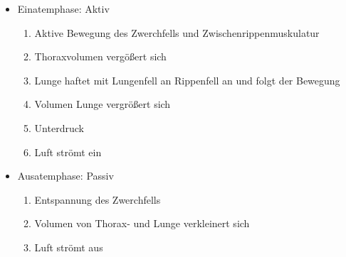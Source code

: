 {  
% 
% 
}%
{%
\begin{itemize}
  \item Einatemphase: Aktiv
  \begin{enumerate}
    \item Aktive Bewegung des Zwerchfells und Zwischenrippenmuskulatur
    \item Thoraxvolumen vergößert sich
    \item Lunge haftet mit Lungenfell an Rippenfell an und folgt der Bewegung
    \item Volumen Lunge vergrößert sich
    \item Unterdruck
    \item Luft strömt ein
  \end{enumerate}
  \item  Ausatemphase: Passiv
  \begin{enumerate}
    \item Entspannung des Zwerchfells
    \item Volumen von Thorax- und Lunge verkleinert sich
    \item Luft strömt aus
  \end{enumerate}
\end{itemize}
}%


